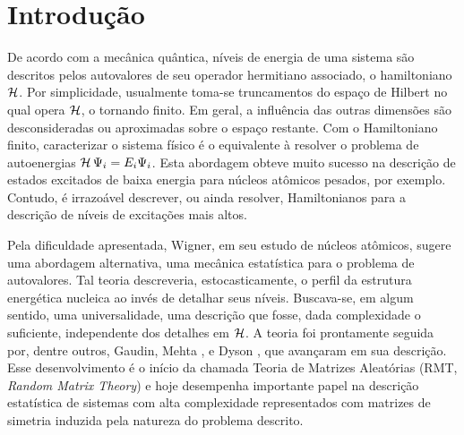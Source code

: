 \chapter{Introdução}
\label{Capitulo: Intro}

De acordo com a mecânica quântica, níveis de energia de uma sistema são descritos pelos autovalores de seu operador hermitiano associado, o hamiltoniano $\operatorname{\mathcal{H}}$. Por simplicidade, usualmente toma-se truncamentos do espaço de Hilbert no qual opera $\operatorname{\mathcal{H}}$, o tornando finito. Em geral, a influência das outras dimensões são desconsideradas ou aproximadas sobre o espaço restante. Com o Hamiltoniano finito, caracterizar o sistema físico é o equivalente à resolver o problema de autoenergias $\operatorname{\mathcal{H}} \Psi_i = E_i \Psi_i$. Esta abordagem obteve muito sucesso na descrição de estados excitados de baixa energia para núcleos atômicos pesados, por exemplo. Contudo, é irrazoável descrever, ou ainda resolver, Hamiltonianos para a descrição de níveis de excitações mais altos.


Pela dificuldade apresentada, Wigner, em seu estudo de núcleos atômicos, sugere uma abordagem alternativa, uma mecânica estatística para o problema de autovalores. Tal teoria descreveria, estocasticamente, o perfil da estrutura energética nucleica ao invés de detalhar seus níveis. Buscava-se, em algum sentido, uma universalidade, uma descrição que fosse, dada complexidade o suficiente, independente dos detalhes em $\operatorname{\mathcal{H}}$. A teoria foi prontamente seguida por, dentre outros, Gaudin, Mehta \cite{MehtaGaudin}, e Dyson \cite{Dyson}, que avançaram em sua descrição. Esse desenvolvimento é o início da chamada Teoria de Matrizes Aleatórias (RMT, \textit{Random Matrix Theory}) e hoje desempenha importante papel na descrição estatística de sistemas com alta complexidade representados com matrizes de simetria induzida pela natureza do problema descrito.

